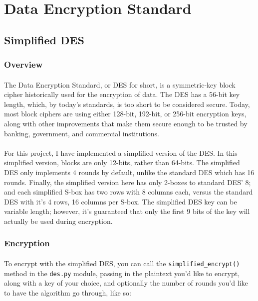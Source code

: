 \documentclass[12pt,a4paper]{article}
\begin{document}

\section{Data Encryption Standard}
\subsection{Simplified DES}
\subsubsection{Overview}
\paragraph{}
The Data Encryption Standard, or DES for short, is a symmetric-key block cipher 
historically used for the encryption of data.  The DES has a 56-bit key length, 
which, by today's standards, is too short to be considered secure.  Today, most 
block ciphers are using either 128-bit, 192-bit, or 256-bit encryption keys, 
along with other improvements that make them secure enough to be trusted by 
banking, government, and commercial institutions.

\paragraph{}
For this project, I have implemented a simplified version of the DES.  In this 
simplified version, blocks are only 12-bits, rather than 64-bits.  The simplified 
DES only implements 4 rounds by default, unlike the standard DES which has 16 
rounds.  Finally, the simplified version here has only 2-boxes to standard DES' 
8; and each simplified S-box has two rows with 8 columns each, versus the standard DES 
with it's 4 rows, 16 columns per S-box.  The simplified DES key can be variable 
length; however, it's guaranteed that only the first 9 bits of
the key will actually be used during encryption.

\subsubsection{Encryption}
\paragraph{}
To encrypt with the simplified DES, you can call the \verb|simplified_encrypt()| 
method in the \verb|des.py| module, passing in the plaintext you'd like to 
encrypt, along with a key of your choice, and optionally the number of rounds 
you'd like to have the algorithm go through, like so:
\end{document}
